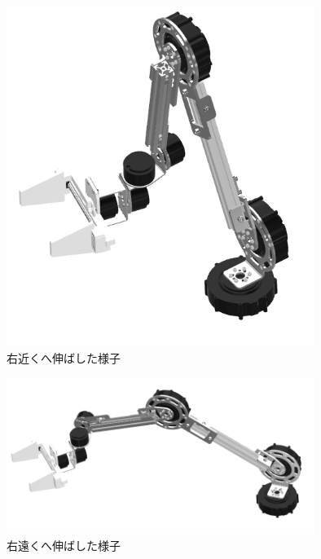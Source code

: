 \begin{figure}[h]
  \centering
  \includegraphics[width=10cm]{images/design/migitika.png}
  \caption{右近くへ伸ばした様子}
  \label{fig:move1}
\end{figure}

\begin{figure}[h]
  \centering
  \includegraphics[width=10cm]{images/design/migioku.png}
  \caption{右遠くへ伸ばした様子}
  \label{fig:move2}
\end{figure}

